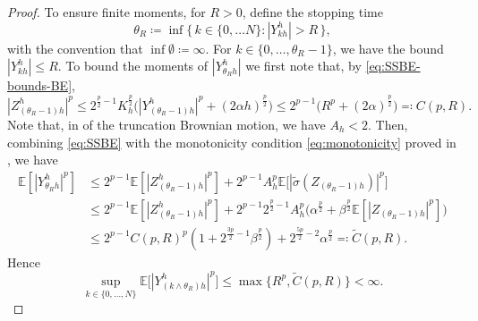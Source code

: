 \documentclass[onseside, final]{amsart}
\theoremstyle{definition}
\newcommand{\E}{\mathbb E}
\numberwithin{equation}{section}
\begin{document}
\begin{proof}
			To ensure finite moments, for $R > 0$, define the stopping time
			\begin{equation}
				\theta_R \coloneqq \inf\{\, k \in \{0, \dotsc N\} : |Y^h_{kh}| > R \,\},
			\end{equation}
			with the convention that $\inf \emptyset \coloneqq \infty$. For $k \in \{0, \dotsc, \theta_R - 1\}$, we have the bound $|Y^h_{kh}| \leq R$. To bound the moments of $|Y^h_{\theta_R h}|$ we first note that, by \eqref{eq:SSBE-bounds-BE},
			\begin{equation}
				|Z^h_{(\theta_R - 1)h}|^p \leq 2^{\frac p2 - 1}K_h^{\frac p2} \bigl(|Y^h_{(\theta_R - 1)h}|^p + (2 \alpha h)^{\frac p2}\bigr) \leq 2^{p - 1} \bigl(R^p + (2 \alpha)^{\frac p2}\bigr) \eqqcolon C(p, R).
			\end{equation}
			Note that, in  of the truncation Brownian motion, we have $A_h < 2$. Then, combining \eqref{eq:SSBE} with the monotonicity condition \eqref{eq:monotonicity} proved in , we have
			\begin{equation}
				\begin{split}
					\E[|Y^h_{\theta_R h}|^p] & \leq 2^{p - 1}\E[|Z^h_{(\theta_R - 1)h}|^p] + 2^{p -1}A_h^p \E\bigl[|\tilde \sigma(Z_{(\theta_R - 1)h})|^p\bigr]\\
					& \leq 2^{p - 1}\E[|Z^h_{(\theta_R - 1)h}|^p] + 2^{p - 1}2^{\frac p 2 - 1}A_h^p \bigl(\alpha^{\frac p2} + \beta^{\frac p2}\E[|Z_{(\theta_R - 1)h}|^p]\bigr)\\
					& \leq 2^{p - 1}C(p, R)^p(1 + 2^{\frac{3p}{2} - 1}\beta^{\frac p2}) + 2^{\frac{5p}{2} - 2}\alpha^{\frac p2} \eqqcolon \tilde C(p, R).
				\end{split}
			\end{equation}
			Hence
			\begin{equation}\label{eq:moments-finite}
				\sup_{k \in \{0, \dotsc, N\}} \E\bigl[|Y^h_{(k \wedge \theta_R)h}|^p\bigr] \leq \max \bigl\{R^p, \tilde C(p, R)\bigr\} < \infty.
			\end{equation}
			

\end{proof}
\end{document}
